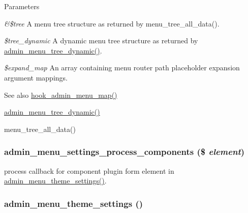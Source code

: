 \begin{DoxyParams}{Parameters}
\item[{\em \&\$tree}]A menu tree structure as returned by menu\_\-tree\_\-all\_\-data(). \item[{\em \$tree\_\-dynamic}]A dynamic menu tree structure as returned by \hyperlink{admin__menu_8inc_a84698cac1efd2078ef2763865995e226}{admin\_\-menu\_\-tree\_\-dynamic()}. \item[{\em \$expand\_\-map}]An array containing menu router path placeholder expansion argument mappings.\end{DoxyParams}
\begin{DoxySeeAlso}{See also}
\hyperlink{admin__menu_8api_8php_a4b3f2235db483f670a2e7327633868df}{hook\_\-admin\_\-menu\_\-map()} 

\hyperlink{admin__menu_8inc_a84698cac1efd2078ef2763865995e226}{admin\_\-menu\_\-tree\_\-dynamic()} 

menu\_\-tree\_\-all\_\-data() 
\end{DoxySeeAlso}
\hypertarget{admin__menu_8inc_ad849bfde07af29eb7536133da2f2b3be}{
\subsubsection[{admin\_\-menu\_\-settings\_\-process\_\-components}]{\setlength{\rightskip}{0pt plus 5cm}admin\_\-menu\_\-settings\_\-process\_\-components (\$ {\em element})}}
\label{admin__menu_8inc_ad849bfde07af29eb7536133da2f2b3be}
process callback for component plugin form element in \hyperlink{admin__menu_8inc_a4e3734f65911708ed221edc2a7007a23}{admin\_\-menu\_\-theme\_\-settings()}. \hypertarget{admin__menu_8inc_a4e3734f65911708ed221edc2a7007a23}{
\subsubsection[{admin\_\-menu\_\-theme\_\-settings}]{\setlength{\rightskip}{0pt plus 5cm}admin\_\-menu\_\-theme\_\-settings ()}}
\label{admin__menu_8inc_a4e3734f65911708ed221edc2a7007a23}
